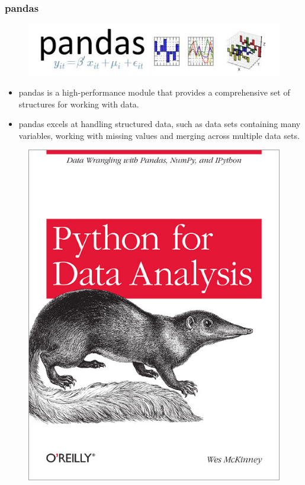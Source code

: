 \documentclass[MASTER.tex]{subfiles}
\begin{document}
	\begin{frame}
		\frametitle{pandas}
		\large
		\begin{figure}
			\centering
			\includegraphics[width=0.7\linewidth]{pandaslogo}
		\end{figure}
		\begin{itemize}
			\item pandas is a high-performance module that provides a comprehensive set of structures for working with
			data. 
			\item pandas excels at handling structured data, such as data sets containing many variables, working with
			missing values and merging across multiple data sets. 
		\end{itemize}
	\end{frame}
\begin{frame}
\begin{figure}
\centering
\includegraphics[width=0.75\linewidth]{pydatabook}

\end{figure}


\end{frame}
\end{document}
